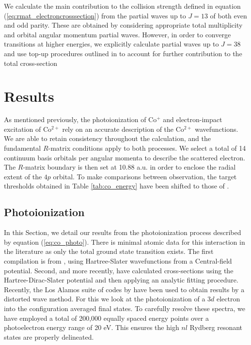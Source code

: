 We calculate the main contribution to the collision strength defined in equation (\ref{eq:rmat_electroncrosssection}) from the partial waves up to $J = 13$ of both even and odd parity. These are obtained by considering appropriate total multiplicity and orbital angular momentum partial waves. However, in order to converge transitions at higher energies, we explicitly calculate partial waves up to $J=38$ and use top-up procedures outlined in \citet{1974JPhB....7L.364B} to account for further contribution to the total cross-section

\section{Results}\label{sec:co_results}
As mentioned previously, the photoionization of Co$^{+}$ and electron-impact excitation of Co$^{2+}$ rely on an accurate description of the Co$^{2+}$ wavefunctions. We are able to retain consistency throughout the calculation, and the fundamental $R$-matrix conditions apply to both processes. We select a total of 14 continuum basis orbitals per angular momenta to describe the scattered electron. The $R$-matrix boundary is then set at 10.88 a.u. in order to enclose the radial extent of the $4p$ orbital. To make comparisons between observation, the target thresholds obtained in Table \ref{tab:co_energy} have been shifted to those of \citet{1985aeli.book.....S}. 

\subsection{Photoionization}
In this Section, we detail our results from the photoionization process described by equation (\ref{eq:co_photo}). There is minimal atomic data for this interaction in the literature as only the total ground state transition exists. The first compilation is from \citet{1979ApJS...40..815R}, using Hartree-Slater wavefunctions from a Central-field potential. Second, and more recently, \citet{1993ADNDT..55..233V} have calculated cross-sections using the Hartree-Dirac-Slater potential and then applying an analytic fitting procedure. Recently, the Los Alamos suite of codes by \citet{2015JPhB...48n4014F} have been used to obtain results by a distorted wave method. For this we look at the photoionization of a $3d$ electron into the configuration averaged final states. 
To carefully resolve these spectra, we have employed a total of 200,000 equally spaced energy points over a photoelectron energy range of 20 eV. This ensures the high $nl$ Rydberg resonant states are properly delineated.

